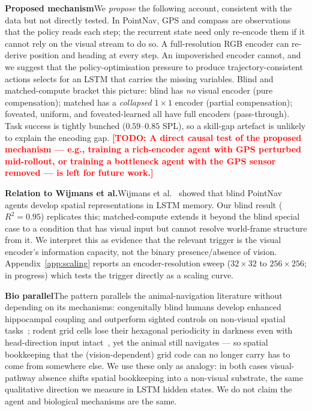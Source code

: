 \documentclass{article}
\newcommand{\TODO}[1]{\textcolor{red}{\textbf{[TODO: #1]}}}
\begin{document}
\noindent\textbf{Proposed mechanism}\quad We \emph{propose} the following account, consistent with the data but not directly tested. In PointNav, GPS and compass are observations that the policy reads each step; the recurrent state need only re-encode them if it cannot rely on the visual stream to do so. A full-resolution RGB encoder can re-derive position and heading at every step. An impoverished encoder cannot, and we suggest that the policy-optimisation pressure to produce trajectory-consistent actions selects for an LSTM that carries the missing variables. Blind and matched-compute bracket this picture: blind has \emph{no} visual encoder (pure compensation); matched has a \emph{collapsed} $1{\times}1$ encoder (partial compensation); foveated, uniform, and foveated-learned all have full encoders (pass-through). Task success is tightly bunched ($0.59$--$0.85$ SPL), so a skill-gap artefact is unlikely to explain the encoding gap. \TODO{A direct causal test of the proposed mechanism --- e.g., training a rich-encoder agent with GPS perturbed mid-rollout, or training a bottleneck agent with the GPS sensor removed --- is left for future work.}

\noindent\textbf{Relation to Wijmans et al.}\quad Wijmans et al.~\citep{wijmans2023emergence} showed that blind PointNav agents develop spatial representations in LSTM memory. Our blind result ($R^2=0.95$) replicates this; matched-compute extends it beyond the blind special case to a condition that has visual input but cannot resolve world-frame structure from it. We interpret this as evidence that the relevant trigger is the visual encoder's information capacity, not the binary presence/absence of vision. Appendix~\ref{app:scaling} reports an encoder-resolution sweep ($32{\times}32$ to $256{\times}256$; in progress) which tests the trigger directly as a scaling curve.

\noindent\textbf{Bio parallel}\quad The pattern parallels the animal-navigation literature without depending on its mechanisms: congenitally blind humans develop enhanced hippocampal coupling and outperform sighted controls on non-visual spatial tasks~\citep{kupers2014blind}; rodent grid cells lose their hexagonal periodicity in darkness even with head-direction input intact~\citep{chen2016grid}, yet the animal still navigates --- so spatial bookkeeping that the (vision-dependent) grid code can no longer carry has to come from somewhere else. We use these only as analogy: in both cases visual-pathway absence shifts spatial bookkeeping into a non-visual substrate, the same qualitative direction we measure in LSTM hidden states. We do not claim the agent and biological mechanisms are the same.
\end{document}
